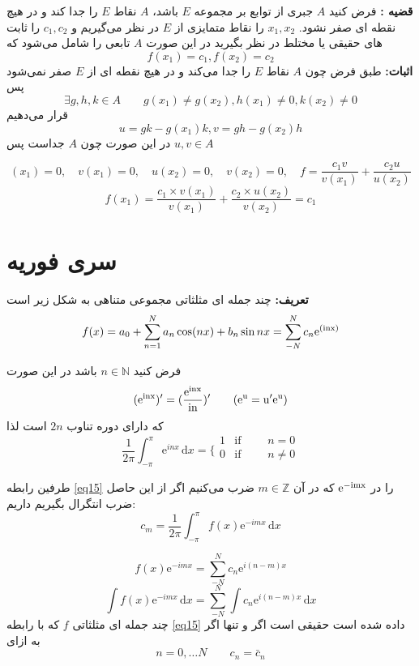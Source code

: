 \documentclass[12pt]{report}
\begin{document}
 \textbf{قضیه :}
 فرض کنید 
 $A$
 جبری از توابع بر مجموعه 
 $E$
 باشد، 
 $A$
 نقاط 
 $E$
 را جدا کند و در هیچ نقطه ای صفر نشود.
 $x_1 , x_2$
  را نقاط متمایزی از 
  $E$
  در نظر می‌گیریم  و 
  $c_1, c_2$
  را ثابت های حقیقی یا مختلط در نظر بگیرید در این صورت
  $A$
  تابعی را شامل می‌شود که
  \[
  f(x_1) = c_1 , f(x_2) = c_2
  \] 
  \textbf{اثبات:}
  طبق فرض  چون 
  $A$
  نقاط 
  $E$
  را جدا می‌کند و در هیچ نقطه ای از 
  $E$
  صفر نمی‌شود پس
  \[
  \exists g , h , k \in A \qquad g(x_1) \neq g(x_2) , h(x_1) \neq 0 , k(x_2) \neq 0
  \]
  قرار می‌دهیم
  \[
  u = gk - g(x_1)k , v = gh - g(x_2)h
  \]
  در این صورت چون 
  $A$
  جداست پس
  $ u , v \in A$
  
  \[(x_1) = 0 , \quad v(x_1) = 0 , \quad u(x_2) = 0 , \quad v(x_2) = 0  , \quad f = \frac{c_1v}{v(x_1)} +\frac{c_2u}{u(x_2)}
  \]
  \[
  f(x_1) = \frac{c_1 \times v(x_1)}{v(x_1)} + \frac{c_2 \times u(x_2)}{v(x_2)} = c_1
  \]
  \chapter{سری فوریه}
  \textbf{تعریف:}
  چند جمله ای مثلثاتی مجموعی متناهی به شکل زیر است
  \begin{equation}\label{eq15}
  	   f(x) = a_0 + \sum_{n = 1}^{N} a_n \cos(nx) + b_n \sin{nx} =  \sum_{-N}^{N} c_n \rm e^{(inx)}
  \end{equation}
 
  فرض کنید 
  $ n \in \mathbb{N}$
  باشد در این صورت
  \[
  \rm (e^{inx})' = (\frac{\rm e^{inx}}{in})' \qquad (\rm e^u = u' \rm e^u)
  \]
  که دارای دوره تناوب 
  $2n$
  است لذا
  \begin{equation*}
  	\frac{1}{2\pi} \int_{-\pi}^{\pi} \mathrm{e}^{inx} \, \mathrm{d}x = \bigg\{
  		\begin{array}{ll}
  			1 & \text{if } \qquad n = 0 \\
  			0 & \text{if }\qquad n \neq 0 \\
  		\end{array}
  \end{equation*}
  
  طرفین رابطه 
  \eqref{eq15}
  را در
  $\rm e^{-imx}$
  که در آن 
  $m \in \mathbb{Z}$
  ضرب می‌کنیم اگر از این حاصل ضرب انتگرال بگیریم داریم:
  \[
  c_m = \frac{1}{2\pi} \int_{-\pi}^{\pi} f(x)\mathrm{e}^{-imx} \, \mathrm{d}x
  \]
  
  \[
	f(x)\mathrm{e}^{-imx} = \sum_{-N}^{N} c_n \mathrm{e}^{i(n - m)x}
  \]
  \[
  \int f(x)\mathrm{e}^{-imx} \, \mathrm{d}x = \sum_{-N}^{N} \int  c_n \mathrm{e}^{i(n - m)x}\, \mathrm{d}x
  \]
  چند جمله ای مثلثاتی 
  $f$
   که با رابطه 
   \eqref{eq15}
   داده شده است حقیقی است اگر و تنها اگر به ازای 
   $$n = 0 , \dots N \qquad c_n = \bar c_n$$
   
\end{document}
